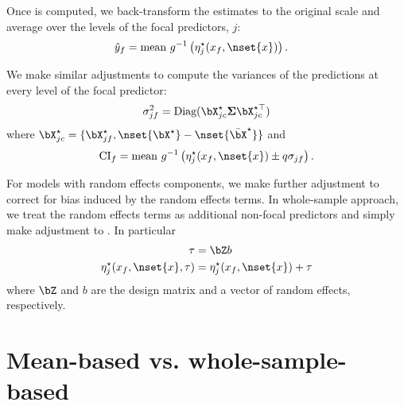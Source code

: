Once  is computed, we back-transform the estimates to the original scale and average over the levels of the focal predictors, $j$:
%
\begin{align}\label{eq:pop_response} 
\hat{y}_f  &= \textrm{mean} ~ g^{-1} \left(\eta_j^\star(x_f, \nset{x})\right).
\end{align}
%

We make similar adjustments to compute the variances of the predictions at every level of the focal predictor:
%
\begin{align}
\sigma_{jf}^2 = \textrm{Diag}(\bX^\star_{jc} \boldsymbol{\Sigma} \bX^{\star\top}_{jc})
\end{align}
where $\bX^{\star}_{jc} = \{\bX_{jf}^\star, \nset{{\bX}^\star} - \nset{{\bar{\bX}}^\star}\}$ and 
%
\begin{align}
\mathrm{CI}_f = \mathrm{mean} ~ g^{-1} \left(\eta_j^\star(x_f, \nset{x}) \pm q\sigma_{jf}\right).
\end{align}
%

For models with random effects components, we make further adjustment to correct for bias induced by the random effects terms. In whole-sample approach, we treat the random effects terms as additional non-focal predictors and simply make adjustment to . In particular
%
\begin{align}\label{eq:pop_eta_re} 
\tau &= \bZ b \nonumber \\
\eta_j^\star(x_f, \nset{x}, \tau)  &= \eta_j^\star(x_f, \nset{x}) + \tau
\end{align}
where $\bZ$ and $b$ are the design matrix and a vector of random effects, respectively.

\section{Mean-based vs. whole-sample-based}

